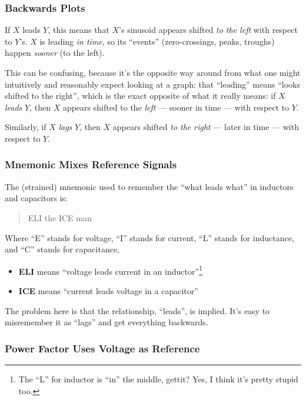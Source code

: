 \documentclass[11pt]{article}
\begin{document}
\subsubsection{Backwards Plots}

If $X$ leads $Y$, this means that $X$'s sinusoid appears shifted
\emph{to the left} with respect to $Y$'s. $X$ is leading \emph{in
  time}, so its ``events'' (zero-crossings, peaks, troughs) happen
\emph{sooner} (to the left).

This can be confusing, because it's the opposite way around from what
one might intuitively and reasonably expect looking at a graph: that
``leading'' means ``looks shifted to the right'', which is the exact
opposite of what it really means: if $X$ \emph{leads} $Y$, then $X$
appears shifted to the \emph{left} --- sooner in time --- with respect
to $Y$.

Similarly, if $X$ \emph{lags} $Y$, then $X$ appears shifted \emph{to
  the right} --- later in time --- with respect to $Y$.

\subsubsection{Mnemonic Mixes Reference Signals}

The (strained) mnemonic used to remember the ``what leads
what'' in inductors and capacitors is:

\begin{quote}
\centering
ELI the ICE man
\end{quote}

Where ``E'' stands for voltage, ``I'' stands for current, ``L''
stands for inductance, and ``C'' stands for capacitance,

\begin{itemize}
  \item {\bf ELI} means ``voltage leads current in an inductor''\footnote{The ``L'' for inductor is ``in'' the middle, gettit? Yes, I think it's pretty stupid too.}
  \item {\bf ICE} means ``current leads voltage in a capacitor''
\end{itemize}

The problem here is that the relationship, ``leads'', is implied. It's
easy to misremember it as ``lags'' and get everything backwards.


\subsubsection{Power Factor Uses Voltage as Reference}
\end{document}
